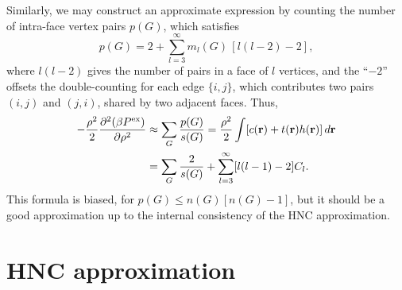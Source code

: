 \documentclass[aip,jcp,reprint,superscriptaddress]{revtex4-1}
\newcommand{\vct}[1]{\mathbf{#1}}
\providecommand{\vr}{} %
\renewcommand{\vr}{\vct{r}}
\newcommand{\supex}[1]{{#1}^{\mathrm{ex}}}
\newcommand{\Pex}{\supex{P}}
\begin{document}
Similarly, we may construct an approximate expression
  by counting the number of intra-face vertex pairs
  $p(G)$, which satisfies
%
\begin{equation}
  p(G)  = 2 + \sum_{l = 3}^\infty m_l(G) \, [l(l-2) - 2],
\label{eq:pyintrafacepairs}
\end{equation}
%
where $l(l-2)$ gives the number of pairs
  in a face of $l$ vertices,
  and the ``$-2$'' offsets the double-counting
  for each edge $\{i, j\}$,
    which contributes two pairs $(i, j)$ and $(j, i)$,
  shared by two adjacent faces.
%
Thus,
%
\begin{align}
            -\frac{\rho^2}{2}
            \frac{\partial^2 ( \beta \Pex ) }
                 {\partial \rho^2}
  &\approx  \sum_G \frac{p(G)}{s(G)}
  =         \frac{\rho^2}{2} \int [c(\vr) + t(\vr) h(\vr) ] \, d\vr
            \notag \\
  &=        \sum_G \frac{2}{s(G)}
            + \sum_{l = 3}^\infty [l(l-1) - 2] C_l.
\label{eq:pyddpressure}
\end{align}
%
This formula is biased, for
  $p(G) \le n(G) [n(G) - 1]$,
but it should be a good approximation
  up to the internal consistency
  of the HNC approximation.





\section{\label{sec:hnc}HNC approximation}
\end{document}
